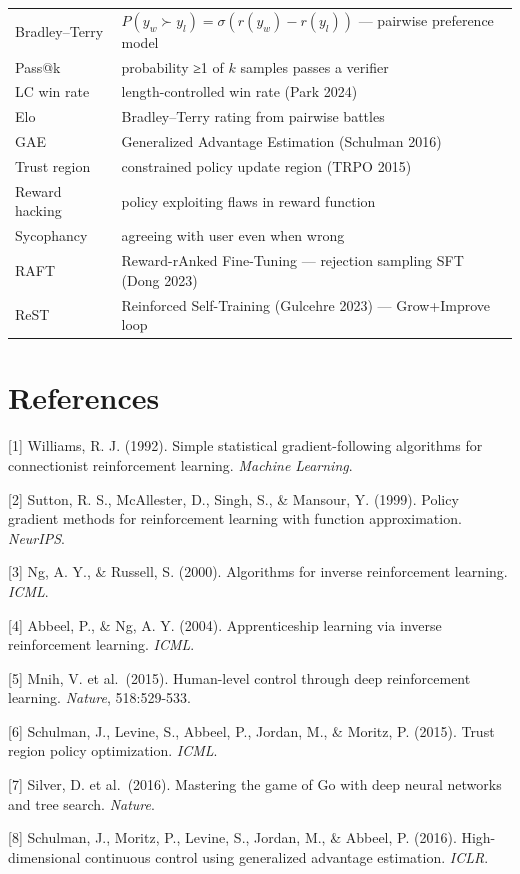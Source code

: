 {\begin{longtable}[]{@{}
  >{\raggedright\arraybackslash}p{}
  >{\raggedright\arraybackslash}p{}@{}}
Bradley--Terry & \(P(y_w \succ y_l) = \sigma(r(y_w) - r(y_l))\) --- pairwise preference model \\
Pass@k & probability ≥1 of \(k\) samples passes a verifier \\
LC win rate & length-controlled win rate (Park 2024) \\
Elo & Bradley--Terry rating from pairwise battles \\
GAE & Generalized Advantage Estimation (Schulman 2016) \\
Trust region & constrained policy update region (TRPO 2015) \\
Reward hacking & policy exploiting flaws in reward function \\
Sycophancy & agreeing with user even when wrong \\
RAFT & Reward-rAnked Fine-Tuning --- rejection sampling SFT (Dong 2023) \\
ReST & Reinforced Self-Training (Gulcehre 2023) --- Grow+Improve loop \\
\end{longtable}
}

\section{References}\label{references}

{[}1{]} Williams, R. J. (1992). Simple statistical gradient-following algorithms for connectionist reinforcement learning. \emph{Machine Learning}.

{[}2{]} Sutton, R. S., McAllester, D., Singh, S., \& Mansour, Y. (1999). Policy gradient methods for reinforcement learning with function approximation. \emph{NeurIPS}.

{[}3{]} Ng, A. Y., \& Russell, S. (2000). Algorithms for inverse reinforcement learning. \emph{ICML}.

{[}4{]} Abbeel, P., \& Ng, A. Y. (2004). Apprenticeship learning via inverse reinforcement learning. \emph{ICML}.

{[}5{]} Mnih, V. et al.~(2015). Human-level control through deep reinforcement learning. \emph{Nature}, 518:529-533.

{[}6{]} Schulman, J., Levine, S., Abbeel, P., Jordan, M., \& Moritz, P. (2015). Trust region policy optimization. \emph{ICML}.

{[}7{]} Silver, D. et al.~(2016). Mastering the game of Go with deep neural networks and tree search. \emph{Nature}.

{[}8{]} Schulman, J., Moritz, P., Levine, S., Jordan, M., \& Abbeel, P. (2016). High-dimensional continuous control using generalized advantage estimation. \emph{ICLR}.

